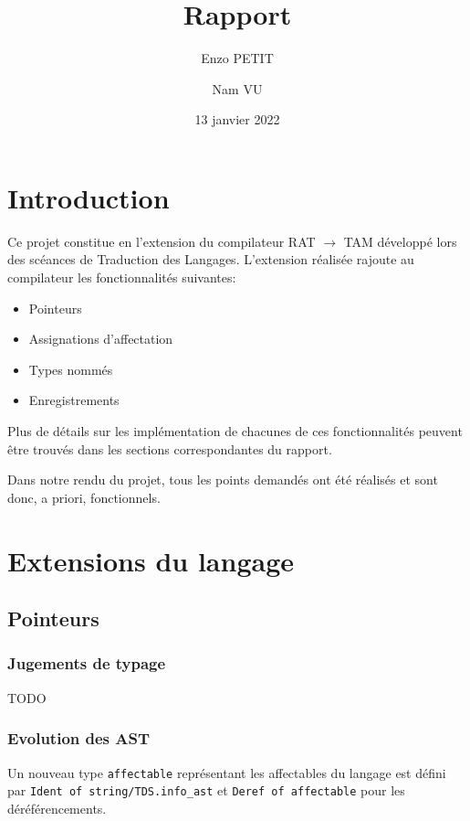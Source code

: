 \documentclass[headings=standardclasses,parskip=half]{scrartcl}
\title{Rapport}
\subtitle{}
\author{Enzo PETIT \and Nam VU}
\date{13 janvier 2022}
\begin{document}
\maketitle

\tableofcontents

\pagebreak

\section{Introduction}
Ce projet constitue en l'extension du compilateur RAT \(\to\) TAM développé
lors des scéances de Traduction des Langages.
L'extension réalisée rajoute au compilateur
les fonctionnalités suivantes:

\begin{itemize}
    \item Pointeurs
    \item Assignations d'affectation
    \item Types nommés
    \item Enregistrements
\end{itemize}

Plus de détails sur les implémentation de chacunes
de ces fonctionnalités peuvent être trouvés dans les sections
correspondantes du rapport.

Dans notre rendu du projet, tous les points demandés ont été réalisés
et sont donc, a priori, fonctionnels.

\section{Extensions du langage}

\subsection{Pointeurs}

\subsubsection*{Jugements de typage}

TODO

\subsubsection*{Evolution des AST}

Un nouveau type \texttt{affectable} représentant les affectables du
langage est défini par \texttt{Ident of string/TDS.info\_ast} et
\texttt{Deref of affectable} pour les déréférencements.
\end{document}
